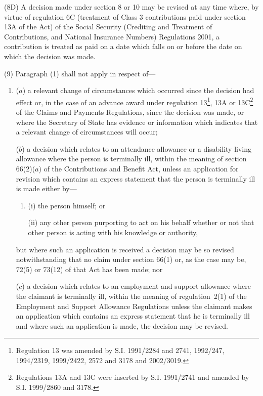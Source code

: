 \documentclass[12pt,a4paper]{article}
\begin{document}
(8D) A decision made under section 8 or 10 may be revised at any time where, by virtue of regulation 6C (treatment of Class 3 contributions paid under section 13A of the Act) of the Social Security (Crediting and Treatment of Contributions, and National Insurance Numbers) Regulations 2001, a contribution is treated as paid on a date which falls on or before the date on which the decision was made.


(9) Paragraph (1) shall not apply in respect of—
\begin{enumerate}\item[]
($a$) a relevant change of circumstances which occurred since the decision 
had effect  %
or, in the case of an advance award under regulation 13\footnote{Regulation 13 was amended by S.I. 1991/2284 and 2741, 1992/247, 1994/2319, 1999/2422, 2572 and 3178 and 2002/3019.}, 13A or 13C\footnote{Regulations 13A and 13C were inserted by S.I. 1991/2741 and amended by S.I. 1999/2860 and 3178.} of the Claims and Payments Regulations, since the decision was made,  %
or where the Secretary of State has evidence or information which indicates that a relevant change of circumstances will occur; 

($b$) a decision which relates to an attendance allowance or a disability living allowance where the person is terminally ill, within the meaning of section 66(2)($a$) of the Contributions and Benefit Act, unless an application for revision which contains an express statement that the person is terminally ill is made either by—
\begin{enumerate}\item[]
(i) the person himself; or

(ii) any other person purporting to act on his behalf whether or not that other person is acting with his knowledge or authority,
\end{enumerate}
but where such an application is received a decision may be so revised notwithstanding that no claim under section 66(1) or, as the case may be, 72(5) or 73(12) of that Act has been made;
%
nor

($c$) a decision which relates to an employment and support allowance where the claimant is terminally ill, within the meaning of regulation~2(1) of the Employment and Support Allowance Regulations unless the claimant makes an application which contains an express statement that he is terminally ill and where such an application is made, the decision may be revised.
\end{enumerate}
\end{document}
